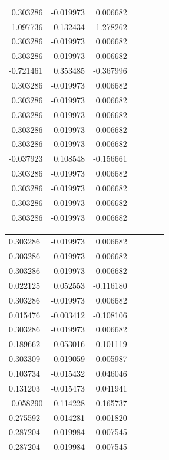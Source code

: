 \documentclass[a4paper,twoside,12pt]{book}
\begin{document}
\begin{appendices}
\begin{table}
\begin{tabular}{rrr}
	 0.303286 & -0.019973 &  0.006682 \\
	-1.097736 &  0.132434 &  1.278262 \\
	 0.303286 & -0.019973 &  0.006682 \\
	 0.303286 & -0.019973 &  0.006682 \\
	-0.721461 &  0.353485 & -0.367996 \\
	 0.303286 & -0.019973 &  0.006682 \\
	 0.303286 & -0.019973 &  0.006682 \\
	 0.303286 & -0.019973 &  0.006682 \\
	 0.303286 & -0.019973 &  0.006682 \\
	 0.303286 & -0.019973 &  0.006682 \\
	-0.037923 &  0.108548 & -0.156661 \\
	 0.303286 & -0.019973 &  0.006682 \\
	 0.303286 & -0.019973 &  0.006682 \\
	 0.303286 & -0.019973 &  0.006682 \\
	 0.303286 & -0.019973 &  0.006682 \\
	 \bottomrule
	\end{tabular}		
\end{table}
\begin{table}
	\centering
	\begin{tabular}{lrrrrrr}
		\toprule
	 0.303286 & -0.019973 &  0.006682 \\
	 0.303286 & -0.019973 &  0.006682 \\
	 0.303286 & -0.019973 &  0.006682 \\
	 0.022125 &  0.052553 & -0.116180 \\
	 0.303286 & -0.019973 &  0.006682 \\
	 0.015476 & -0.003412 & -0.108106 \\
	 0.303286 & -0.019973 &  0.006682 \\
	 0.189662 &  0.053016 & -0.101119 \\
	 0.303309 & -0.019059 &  0.005987 \\
	 0.103734 & -0.015432 &  0.046046 \\
	 0.131203 & -0.015473 &  0.041941 \\
	-0.058290 &  0.114228 & -0.165737 \\
	 0.275592 & -0.014281 & -0.001820 \\
	 0.287204 & -0.019984 &  0.007545 \\
	 0.287204 & -0.019984 &  0.007545 \\

\end{tabular}
\end{table}
\end{appendices}
\end{document}
